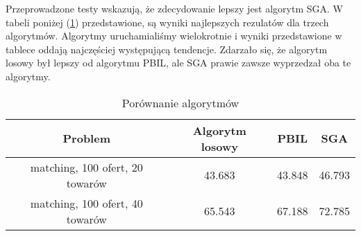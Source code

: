 Przeprowadzone testy wskazują, że zdecydowanie lepszy jest algorytm SGA.
W tabeli poniżej (\ref{tabela:porownanie}) przedstawione, są wyniki najlepszych rezulatów dla trzech algorytmów.
Algorytmy uruchamialiśmy wielokrotnie i wyniki przedstawione w tablece oddają najczęściej występującą tendencje.
Zdarzało się, że algorytm losowy był lepszy od algorytmu PBIL, ale SGA prawie zawsze wyprzedzał oba te algorytmy.

\begin{table}[!ht]
    \centering
    \begin{tabular}{c c c c}
        Problem & Algorytm losowy & PBIL & SGA \\ \hline\hline
        matching, 100 ofert, 20 towarów & 43.683 & 43.848 & 46.793 \\
        matching, 100 ofert, 40 towarów & 65.543 & 67.188 & 72.785 \\
    \end{tabular}
    \caption{Porównanie algorytmów}
    \label{tabela:porownanie}
\end{table}

